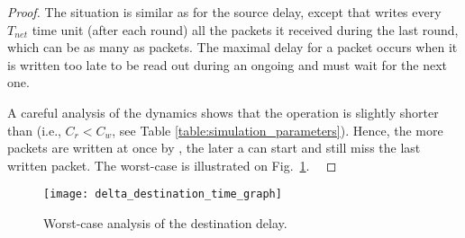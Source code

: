 \begin{proof}
The situation is similar as for the source delay, except
that \cpdst writes every $T_{net}$ time unit (\ie after each round) all the packets it received during the last round, which can be as many as \nslotsmax packets.
The maximal delay for a packet occurs when it is written too late to be read out during an ongoing \opflush and must wait for the next one.

A careful analysis of the \bolt dynamics shows that the \opread operation is slightly shorter than \opwrite \cite{sutton2015Bolt} (i.e., $C_r < C_w$, see Table \ref{table:simulation_parameters}). Hence, the more packets are written at once by \cpdst, the later a \opflush can start and still miss the last written packet. The worst-case is illustrated on Fig.~\ref{fig:delta_destination_time_graph}. \
\end{proof}

\begin{figure}[h!]
\centering
\texttt{[image: delta\_destination\_time\_graph]}
\caption{Worst-case analysis of the destination delay.
}
\label{fig:delta_destination_time_graph}
\end{figure}
